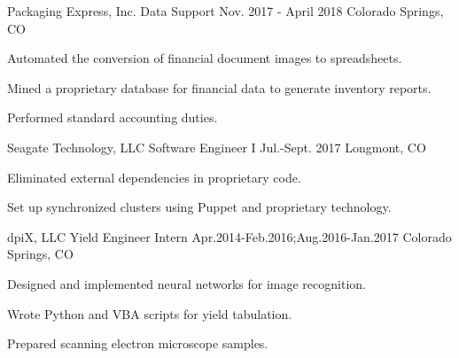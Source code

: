 \begin{cventries}
 \cventry
    {Packaging Express, Inc.} %
    {Data Support} %
    {Nov. 2017 - April 2018} %
    {Colorado Springs, CO} %
    {
     \begin{cvitems} %
      \item {Automated the conversion of financial document images to spreadsheets.}
      \item {Mined a proprietary database for financial data to generate inventory reports.}
      \item {Performed standard accounting duties.}
     \end{cvitems}
   }

  \cventry
  	{Seagate Technology, LLC} %
    {Software Engineer I} %
    {Jul.-Sept. 2017} %
    {Longmont, CO} %
    {
      \begin{cvitems} %
        \item {Eliminated external dependencies in proprietary code.}
        \item {Set up synchronized clusters using Puppet and proprietary technology.}
      \end{cvitems}
    }
  \cventry
  	{dpiX, LLC} %
    {Yield Engineer Intern} %
    {Apr.2014-Feb.2016;Aug.2016-Jan.2017} %
    {Colorado Springs, CO} %
    {
      \begin{cvitems} %
        \item {Designed and implemented neural networks for image recognition.}
        \item {Wrote Python and VBA scripts for yield tabulation.}
        \item {Prepared scanning electron microscope samples.}
      \end{cvitems}
}
\end{cventries}
